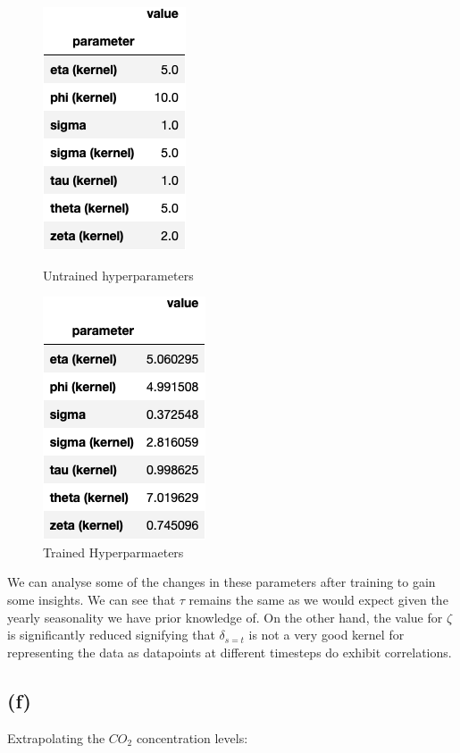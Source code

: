 \documentclass[12pt]{article}
\begin{document}
\begin{figure}[h]
\centering
\begin{minipage}{.5\textwidth}
  \centering
\includegraphics[scale=0.5]{outputs/q2/f-untrained-parameters}
\caption{Untrained hyperparameters}
\label{fig:f-untrained-parameters}
\end{minipage}%
\begin{minipage}{.5\textwidth}
  \centering
\includegraphics[scale=0.5]{outputs/q2/f-trained-parameters}
\caption{Trained Hyperparmaeters}
\label{fig:f-trained-parameters}
\end{minipage}
\end{figure}

We can analyse some of the changes in these parameters after training to gain some insights.
We can see that $\tau$ remains the same as we would expect given the yearly seasonality we have prior knowledge of.
On the other hand, the value for $\zeta$ is significantly reduced signifying that $\delta_{s=t}$ is not a very good kernel for representing the data as datapoints at different timesteps do exhibit correlations.

\newpage
\subsection*{(f)}
Extrapolating the $CO_2$ concentration levels:
\end{document}
